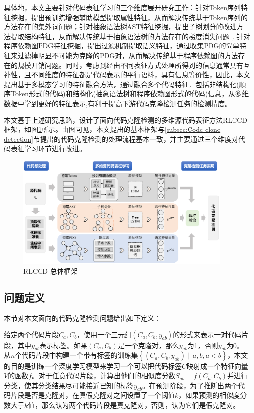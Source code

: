 具体地，本文主要针对代码表征学习的三个维度展开研究工作：针对Token序列特征挖掘，提出预训练增强辅助模型提取属性特征，从而解决传统基于Token序列的方法存在的集外词问题；针对抽象语法树AST特征挖掘，提出子树划分的改进方法提取结构特征，从而解决传统基于抽象语法树的方法存在的梯度消失问题；针对程序依赖图PDG特征挖掘，提出过滤机制提取语义特征，通过收集PDG的简单特征来过滤掉明显不可能为克隆的PDG对，从而解决传统基于程序依赖图的方法存在的规模开销问题。同时，考虑到经由不同表征方式处理所得到的信息通常具有互补性，且不同维度的特征都是代码表示的平行语料，具有信息等价性，因此，本文提出基于多模态学习的特征融合方法，通过融合多个代码特征，包括非结构化(顺序Token形式的代码)和结构化(抽象语法树和程序依赖图形式的代码)信息，从多维数据中学到更好的特征表示,有利于提高下游代码克隆检测任务的检测精度。

本文基于上述研究思路，设计了面向代码克隆检测的多维源代码表征方法RLCCD框架，如图\ref{fig:framework}所示。由图可见，本文提出的基本框架与\ref{subsec:Code clone detection}节提出的代码克隆检测的处理流程基本一致，并主要通过三个维度对代码表征学习环节进行改进。

\begin{figure}[H]
    \centering
    \includegraphics[width=0.95\textwidth]{figures/framework}
    \caption{RLCCD 总体框架}
    \label{fig:framework}
\end{figure}

\subsection{问题定义}
\label{subsec:Definition}
本节对本文面向的代码克隆检测问题给出如下定义：

给定两个代码片段$C_{a},C_{b}$，使用一个三元组$(C_{a},C_{b},y_{ab})$的形式来表示一对代码片段，其中$y_{ab}$表示标签。如果$(C_{a},C_{b})$是一个克隆对，那么$y_{ab}$为1，否则$y_{ab}$为0。从$n$个代码片段中构建一个带有标签的训练集$\left\{(C_{a},C_{b},y_{ab})\|a,b,a<b\right\}$，本文的目的是训练一个深度学习模型来学习一个可以把代码标签$C$映射成一个特征向量$V$的函数$f$。对于任意代码片段，计算出他们的相似度分数$S_{ab} = f(C_{a},C_{b})$并进行分类，使其分类结果尽可能接近已知的标签$y_{ab}$。在预测阶段，为了推断出两个代码片段是否是克隆对，在真假克隆对之间设置了一个阈值$k$，如果预测的相似度分数大于$k$值，那么认为两个代码片段是真克隆对，否则，认为它们是假克隆对。

